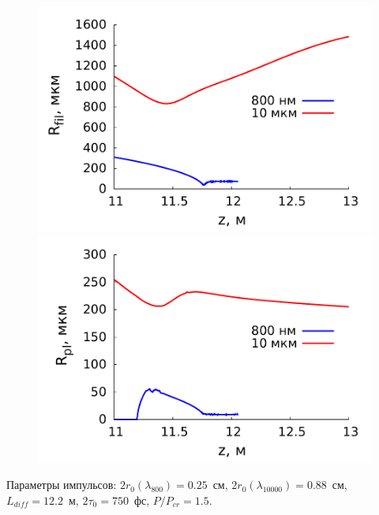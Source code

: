\documentclass[fullscreen=true,unicode,bookmarks=true]{beamer}
\begin{document}
\begin{frame}
\begin{figure}[H]
\begin{center}
                \begin{minipage}[h]{0.40\linewidth}
                    \includegraphics[width=0.95\linewidth]{pulses/vs/r_fil_cut}
                \end{minipage}
                \hspace{0.10\linewidth}
                \begin{minipage}[h]{0.40\linewidth}
                    \includegraphics[width=0.95\linewidth]{pulses/vs/r_pl_cut}
                \end{minipage}
            \end{center}
        \end{figure}
        
        \footnotesize{
        	Параметры импульсов: $2 r_0(\lambda_{800}) = 0.25$~см, $2 r_0(\lambda_{10000}) = 0.88$~см, $L_{diff} = 12.2$~м,
        	$2\tau_0 = 750$~фс, $P/P_{cr} = 1.5$.
        }
    \end{frame}
\end{document}
